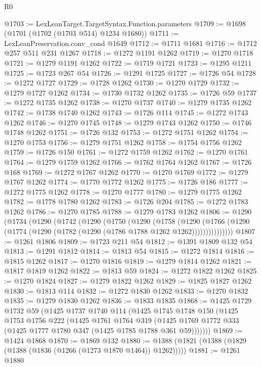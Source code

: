 \begin{lexlean}{R0}
\begin{coremodule}
@1703 := LexLeanTarget.TargetSyntax.Function.parameters
@1709 := @1698 (@1701 (@1702 (@1703 @514) @1234 @1680))
@1711 := LexLeanPreservation.conv_cond @1649
@1712 := @1711 @1681
@1716 := @1712 @257 @511 @231 @1267
@1718 := @1272 @1191 @1262
@1719 := @1270 @1718
@1721 := @1279 @1191 @1262
@1722 := @1719 @1721
@1723 := @1295 @1211
@1725 := @1723 @267 @54
@1726 := @1291 @1725
@1727 := @1726 @54
@1728 := @1272 @1727
@1729 := @1728 @1262
@1730 := @1270 @1729
@1732 := @1279 @1727 @1262
@1734 := @1730 @1732 @1262
@1735 := @1726 @59
@1737 := @1272 @1735 @1262
@1738 := @1270 @1737
@1740 := @1279 @1735 @1262
@1742 := @1738 @1740 @1262
@1743 := @1726 @114
@1745 := @1272 @1743 @1262
@1746 := @1270 @1745
@1748 := @1279 @1743 @1262
@1750 := @1746 @1748 @1262
@1751 := @1726 @132
@1753 := @1272 @1751 @1262
@1754 := @1270 @1753
@1756 := @1279 @1751 @1262
@1758 := @1754 @1756 @1262
@1759 := @1726 @150
@1761 := @1272 @1759 @1262
@1762 := @1270 @1761
@1764 := @1279 @1759 @1262
@1766 := @1762 @1764 @1262
@1767 := @1726 @168
@1769 := @1272 @1767 @1262
@1770 := @1270 @1769
@1772 := @1279 @1767 @1262
@1774 := @1770 @1772 @1262
@1775 := @1726 @186
@1777 := @1272 @1775 @1262
@1778 := @1270 @1777
@1780 := @1279 @1775 @1262
@1782 := @1778 @1780 @1262
@1783 := @1726 @204
@1785 := @1272 @1783 @1262
@1786 := @1270 @1785
@1788 := @1279 @1783 @1262
@1806 := @1290
    (@1734
      (@1290
        (@1742
          (@1290
            (@1750
              (@1290
                (@1758
                  (@1290
                    (@1766
                      (@1290 (@1774 (@1290 (@1782 (@1290 (@1786 @1788 @1262 @1262)))))))))))))))
@1807 := @1261 @1806
@1809 := @1723 @211 @54
@1812 := @1391 @1809 @132 @54
@1813 := @1291 @1812
@1814 := @1813 @54
@1815 := @1272 @1814
@1816 := @1815 @1262
@1817 := @1270 @1816
@1819 := @1279 @1814 @1262
@1821 := @1817 @1819 @1262
@1822 := @1813 @59
@1824 := @1272 @1822 @1262
@1825 := @1270 @1824
@1827 := @1279 @1822 @1262
@1829 := @1825 @1827 @1262
@1830 := @1813 @114
@1832 := @1272 @1830 @1262
@1833 := @1270 @1832
@1835 := @1279 @1830 @1262
@1836 := @1833 @1835
@1868 := @1425
    @1729
    @1732
    @59
    (@1425
      @1737
      @1740
      @114
      (@1425
        @1745
        @1748
        @150
        (@1425
          @1753
          @1756
          @222
          (@1425
            @1761
            @1764
            @319
            (@1425 @1769 @1772 @333 (@1425 @1777 @1780 @347 (@1425 @1785 @1788 @361 @59)))))))
@1869 := @1424 @1868
@1870 := @1869 @132
@1880 := @1388 (@1821 (@1388 (@1829 (@1388 (@1836 (@1266 (@1273 @1870 @1464)) @1262)))))
@1881 := @1261 @1880

\end{coremodule}
\end{lexlean}
